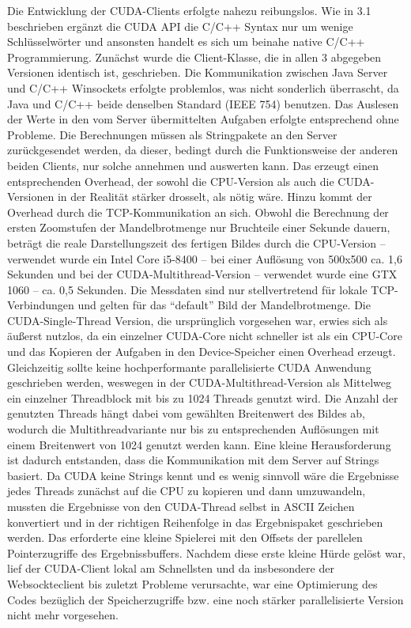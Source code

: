 \documentclass[12pt, onecolumn, notitlepage]{scrartcl}
\begin{document}
Die Entwicklung der CUDA-Clients erfolgte nahezu reibungslos. Wie in 3.1 beschrieben ergänzt die CUDA API die C/C++ Syntax nur um wenige Schlüsselwörter und ansonsten handelt es sich um beinahe native C/C++ Programmierung. 
Zunächst wurde die Client-Klasse, die in allen 3 abgegeben Versionen identisch ist, geschrieben. Die Kommunikation zwischen Java Server und C/C++ Winsockets erfolgte problemlos, was nicht sonderlich überrascht, da Java und C/C++ beide denselben Standard (IEEE 754) benutzen. Das Auslesen der Werte in den vom Server übermittelten Aufgaben erfolgte entsprechend ohne Probleme. Die Berechnungen müssen als Stringpakete an den Server zurückgesendet werden, da dieser, bedingt durch die Funktionsweise der anderen beiden Clients, nur solche annehmen und auswerten kann. Das erzeugt einen entsprechenden Overhead, der sowohl die CPU-Version als auch die CUDA-Versionen in der Realität stärker drosselt, als nötig wäre. Hinzu kommt der Overhead durch die TCP-Kommunikation an sich. Obwohl die Berechnung der ersten Zoomstufen der Mandelbrotmenge nur Bruchteile einer Sekunde dauern, beträgt die reale Darstellungszeit des fertigen Bildes durch die CPU-Version -- verwendet wurde ein Intel Core i5-8400 -- bei einer Auflösung von 500x500 ca. 1,6 Sekunden und bei der CUDA-Multithread-Version -- verwendet wurde eine GTX 1060 -- ca. 0,5 Sekunden. Die Messdaten sind nur stellvertretend für lokale TCP-Verbindungen und gelten für das \enquote{default} Bild der Mandelbrotmenge.
Die CUDA-Single-Thread Version, die ursprünglich vorgesehen war, erwies sich als äußerst nutzlos, da ein einzelner CUDA-Core nicht schneller ist als ein CPU-Core und das Kopieren der Aufgaben in den Device-Speicher einen Overhead erzeugt. Gleichzeitig sollte keine hochperformante parallelisierte CUDA Anwendung geschrieben werden, weswegen in der CUDA-Multithread-Version als Mittelweg ein einzelner Threadblock mit bis zu 1024 Threads genutzt wird. Die Anzahl der genutzten Threads hängt dabei vom gewählten Breitenwert des Bildes ab, wodurch die Multithreadvariante nur bis zu entsprechenden Auflösungen mit einem Breitenwert von 1024 genutzt werden kann.
Eine kleine Herausforderung ist dadurch entstanden, dass die Kommunikation mit dem Server auf Strings basiert. Da CUDA keine Strings kennt und es wenig sinnvoll wäre die Ergebnisse jedes Threads zunächst auf die CPU zu kopieren und dann umzuwandeln, mussten die Ergebnisse von den CUDA-Thread selbst in ASCII Zeichen konvertiert und in der richtigen Reihenfolge in das Ergebnispaket geschrieben werden. Das erforderte eine kleine Spielerei mit den Offsets der parellelen Pointerzugriffe des Ergebnissbuffers. Nachdem diese erste kleine Hürde gelöst war, lief der CUDA-Client lokal am Schnellsten und da insbesondere der Websockteclient bis zuletzt Probleme verursachte, war eine Optimierung des Codes bezüglich der Speicherzugriffe bzw. eine noch stärker parallelisierte Version nicht mehr vorgesehen. 
\end{document}
